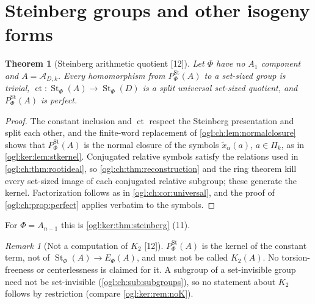 \documentclass[11pt,oneside]{article}
\numberwithin{equation}{section}
\newtheorem{theorem}{Theorem}[section]
\theoremstyle{definition}
\theoremstyle{remark}
\newtheorem{remark}[remark]{Remark}
\newcommand{\A}{\mathcal A}
\newcommand{\ct}{\operatorname{ct}}
\newcommand{\St}{\operatorname{St}}
\newcommand{\src}[1]{\textup{\textsf{\small[#1]}}}
\begin{document}
\section{Steinberg groups and other isogeny forms}\label{ogl:ch:sec:steinberg}

\begin{theorem}[Steinberg arithmetic quotient \src{12}]\label{ogl:ch:thm:steinberg}
Let $\Phi$ have no $A_1$ component and $A=\A_{D,k}$. Every homomorphism from
$P^{\St}_\Phi(A)$ to a set-sized group is trivial, $\ct:\St_\Phi(A)\to\St_\Phi(D)$
is a split universal set-sized quotient, and $P^{\St}_\Phi(A)$ is perfect.
\end{theorem}
\begin{proof}
The constant inclusion and $\ct$ respect the Steinberg presentation and split
each other, and the finite-word replacement of \cref{ogl:ch:lem:normalclosure}
shows that $P^{\St}_\Phi(A)$ is the normal closure of the symbols
$\tilde x_\alpha(a)$, $a\in\Pi_k$, as in \cref{ogl:ker:lem:stkernel}.
Conjugated relative symbols satisfy the relations used in
\cref{ogl:ch:thm:rootideal}, so \cref{ogl:ch:thm:reconstruction} and the ring
theorem kill every set-sized image of each conjugated relative subgroup; these
generate the kernel. Factorization follows as in \cref{ogl:ch:cor:universal}, and
the proof of \cref{ogl:ch:prop:perfect} applies verbatim to the symbols.
\end{proof}

For $\Phi=A_{n-1}$ this is \cref{ogl:ker:thm:steinberg} (11).

\begin{remark}[Not a computation of $K_2$ \src{12}]\label{ogl:ch:rem:K2}
$P^{\St}_\Phi(A)$ is the kernel of the constant term, not of
$\St_\Phi(A)\to E_\Phi(A)$, and must not be called $K_2(A)$. No torsion-freeness
or centerlessness is claimed for it. A subgroup of a set-invisible group need
not be set-invisible (\cref{ogl:ch:sub:subgroups}), so no statement about $K_2$
follows by restriction (compare \cref{ogl:ker:rem:noK}).
\end{remark}
\end{document}
